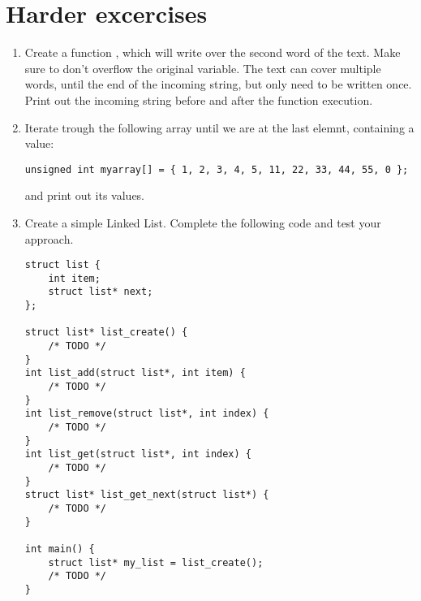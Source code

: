 \documentclass[12pt,a4paper]{article}
\begin{document}
    \newpage
    \section{Harder excercises}
    \begin{enumerate}
        \item Create a function , which will write  over the second
              word of the text. Make sure to don't overflow the original variable. The text can cover multiple words,
              until the end of the incoming string, but only need to be written once. Print out the incoming string
              before and after the function execution.
        \item Iterate trough the following array until we are at the last elemnt, containing a  value:
              \begin{lstlisting}[style=CStyle]
unsigned int myarray[] = { 1, 2, 3, 4, 5, 11, 22, 33, 44, 55, 0 };
\end{lstlisting}
              and print out its values.
        \item Create a simple Linked List. Complete the following code and test your approach.
              \begin{lstlisting}[style=CStyle]
struct list {
    int item;
    struct list* next;
};

struct list* list_create() {
    /* TODO */
}
int list_add(struct list*, int item) {
    /* TODO */
}
int list_remove(struct list*, int index) {
    /* TODO */
}
int list_get(struct list*, int index) {
    /* TODO */
}
struct list* list_get_next(struct list*) {
    /* TODO */
}

int main() {
    struct list* my_list = list_create();
    /* TODO */
}
\end{lstlisting}
    \end{enumerate}

\end{document}

